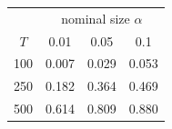 % 
\begin{tabular}{cccc}
  \hline
  & \multicolumn{3}{c}{nominal size $\alpha$} \\
 $T$ & 0.01 & 0.05 & 0.1 \\
 \hline
100 & 0.007 & 0.029 & 0.053 \\ 
  250 & 0.182 & 0.364 & 0.469 \\ 
  500 & 0.614 & 0.809 & 0.880 \\ 
   \hline
\end{tabular}
